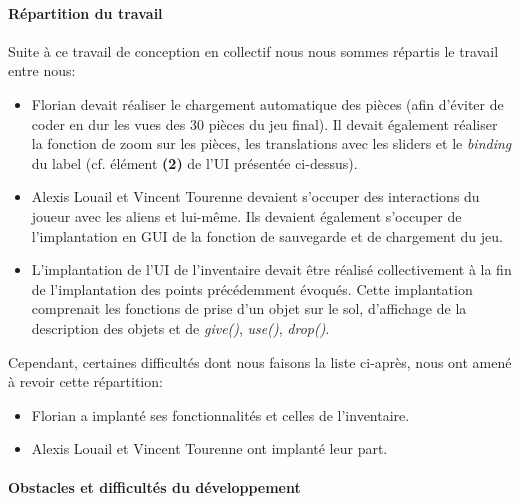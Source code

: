 \documentclass[./standalone.tex]{subfiles}
\begin{document}
\paragraph{Répartition du travail\\}
Suite à ce travail de conception en collectif nous nous sommes répartis le travail entre nous:
\begin{itemize}
	\item Florian devait réaliser le chargement automatique des pièces (afin d'éviter de coder en dur les vues des 30 pièces du jeu final). Il devait également réaliser la fonction de zoom sur les pièces, les translations avec les sliders et le \textit{binding} du label (cf. élément \textbf{(2)} de l'UI présentée ci-dessus).
	\item Alexis Louail et Vincent Tourenne devaient s'occuper des interactions du joueur avec les aliens et lui-même. Ils devaient également s'occuper de l'implantation en GUI de la fonction de sauvegarde et de chargement du jeu.
	\item L'implantation de l'UI de l'inventaire devait être réalisé collectivement à la fin de l'implantation des points précédemment évoqués. Cette implantation comprenait les fonctions de prise d'un objet sur le sol, d'affichage de la description des objets et de \textit{give()}, \textit{use()}, \textit{drop()}.\\
\end{itemize}

Cependant, certaines difficultés dont nous faisons la liste ci-après, nous ont amené à revoir cette répartition:
\begin{itemize}
	\item Florian a implanté ses fonctionnalités et celles de l'inventaire.
	\item Alexis Louail et Vincent Tourenne ont implanté leur part.\\
\end{itemize}
 
\paragraph{Obstacles et difficultés du développement\\}
\end{document}
